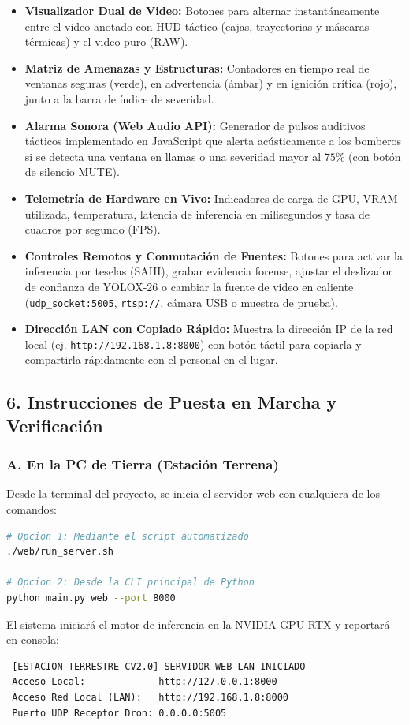\documentclass[11pt,a4paper]{article}
\begin{document}
\begin{itemize}
    \item \textbf{Visualizador Dual de Video:} Botones para alternar instantáneamente entre el video anotado con HUD táctico (cajas, trayectorias y máscaras térmicas) y el video puro (RAW).
    \item \textbf{Matriz de Amenazas y Estructuras:} Contadores en tiempo real de ventanas seguras (verde), en advertencia (ámbar) y en ignición crítica (rojo), junto a la barra de índice de severidad.
    \item \textbf{Alarma Sonora (Web Audio API):} Generador de pulsos auditivos tácticos implementado en JavaScript que alerta acústicamente a los bomberos si se detecta una ventana en llamas o una severidad mayor al $75\%$ (con botón de silencio MUTE).
    \item \textbf{Telemetría de Hardware en Vivo:} Indicadores de carga de GPU, VRAM utilizada, temperatura, latencia de inferencia en milisegundos y tasa de cuadros por segundo (FPS).
    \item \textbf{Controles Remotos y Conmutación de Fuentes:} Botones para activar la inferencia por teselas (SAHI), grabar evidencia forense, ajustar el deslizador de confianza de YOLOX-26 o cambiar la fuente de video en caliente (\texttt{udp\_socket:5005}, \texttt{rtsp://}, cámara USB o muestra de prueba).
    \item \textbf{Dirección LAN con Copiado Rápido:} Muestra la dirección IP de la red local (ej. \texttt{http://192.168.1.8:8000}) con botón táctil para copiarla y compartirla rápidamente con el personal en el lugar.
\end{itemize}

\subsection*{6. Instrucciones de Puesta en Marcha y Verificación}

\subsubsection*{A. En la PC de Tierra (Estación Terrena)}
Desde la terminal del proyecto, se inicia el servidor web con cualquiera de los comandos:
\begin{lstlisting}[language=bash]
# Opcion 1: Mediante el script automatizado
./web/run_server.sh

# Opcion 2: Desde la CLI principal de Python
python main.py web --port 8000
\end{lstlisting}
El sistema iniciará el motor de inferencia en la NVIDIA GPU RTX y reportará en consola:
\begin{verbatim}
 [ESTACION TERRESTRE CV2.0] SERVIDOR WEB LAN INICIADO
 Acceso Local:             http://127.0.0.1:8000
 Acceso Red Local (LAN):   http://192.168.1.8:8000
 Puerto UDP Receptor Dron: 0.0.0.0:5005
\end{verbatim}
\end{document}
